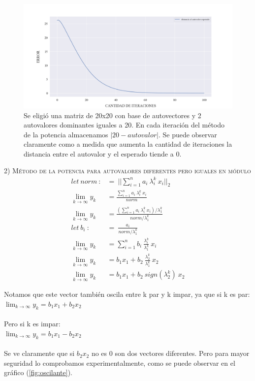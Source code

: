 \vspace{1em}
\begin{figure}[!htbp]
    \includegraphics[scale=0.45]{files/src/.media/op_autovalor_repetido.png}
    \caption{Se eligió una matriz de 20x20 con base de autovectores y 2 autovalores dominantes iguales a 20. En cada iteración del método de la potencia almacenamos $|20 - autovalor|$. Se puede observar claramente como a medida que aumenta la cantidad de iteraciones la distancia entre el autovalor y el esperado tiende a 0.}
    \label{fig:autovalor_repetido}
\end{figure}

\noindent \textsc{2) Método de la potencia para autovalores diferentes pero iguales en módulo}
\begin{align}
    let \ norm \ :&= \ ||\sum_{i=1}^{n} a_i \ \lambda_{i}^{k} \ x_i||_2 \\
    \lim_{k \to \infty} y_k &= \frac{\sum_{i=1}^{n} a_i \ \lambda_{i}^{k} \ x_i }{norm} \\ 
    \lim_{k \to \infty} y_k &= \frac{(\sum_{i=1}^{n} a_i \ \lambda_{i}^{k} \ x_i) / \lambda_{1}^{k}}{norm / \lambda_{1}^{k}} \\
    let \ b_i \ :&= \ \frac{a_i}{norm / \lambda_{1}^{k}} \\
    \lim_{k \to \infty} y_k &= \sum_{i=1}^{n} b_i \ \frac{\lambda_{i}^{k}}{\lambda_{1}^{k}} \ x_i \\
    \lim_{k \to \infty} y_k &= b_1 x_1 + b_2 \ \frac{\lambda_{2}^{k}}{\lambda_{1}^{k}} \ x_2 \\
    \lim_{k \to \infty} y_k &= b_1 x_1 + b_2 \ sign(\lambda_{2}^{k}) \ x_2 
\end{align}


\noindent Notamos que este vector también oscila entre k par y k impar, ya que si k es par: \\
\indent\indent $\lim_{k \to \infty} y_k = b_1 x_1 + b_2 x_2$ \\ \\
Pero si k es impar: \\
\indent \indent $\lim_{k \to \infty} y_k = b_1 x_1 - b_2 x_2$ \\ \\
Se ve claramente que si $b_2 x_2$ no es 0 son dos vectores diferentes.
Pero para mayor seguridad lo comprobamos experimentalmente, como se puede observar en el gráfico (\ref{fig:oscilante}).


